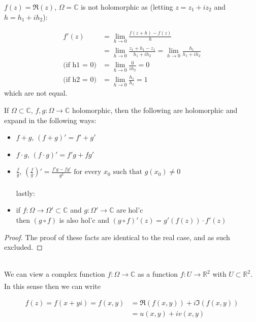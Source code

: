 \begin{example}
$f(z)=\Re(z)$, $\Omega = \mathbb{C}$ is not holomorphic as (letting $z = z_1 + i z_2$ and $h = h_1 + i h_2$):

\begin{align*}
    f'(z) &= \lim_{h\xrightarrow{} 0}\frac{f(z+h)-f(z)}{h}\\
    &= \lim_{h\xrightarrow{} 0}\frac{z_1+h_1-z_1}{h_1+ih_2} = \lim_{h\xrightarrow{} 0}\frac{h_1}{h_1+ih_2}\\
    \text{(if h1 = 0)} &= \lim_{h\xrightarrow{} 0}\frac{0}{ih_2}=0\\
    \text{(if h2 = 0)} &= \lim_{h\xrightarrow{} 0}\frac{h_1}{h_1}=1
\end{align*} which are not equal.
\end{example}

\begin{lemma}
If $\Omega \subset \mathbb{C}$, $f,g:\Omega \xrightarrow{} \mathbb{C}$ holomorphic, then the following are holomorphic and expand in the following ways:

\begin{itemize}
    \item $f+g$, $(f+g)' = f'+g'$
    \item $f \cdot g$, $(f \cdot g)' = f'g+fg'$\\
    \item $\frac{f}{g}$, $\left( \frac{f}{g} \right)' = \frac{f'g-fg'}{g^2} \text{ for every $x_0$ such that $g(x_0) \neq 0$ }$\\\\
    lastly:
    \item if $f:\Omega\xrightarrow{}\Omega' \subset \mathbb{C}$ and $g:\Omega'\xrightarrow{}\mathbb{C}$ are hol'c\\ then $(g \circ f)$ is also hol'c and $(g \circ f)'(z) = g'(f(z))\cdot f'(z)$
\end{itemize}
\end{lemma}

\begin{proof}
The proof of these facts are identical to the real case, and as such excluded.
\end{proof}\\



We can view a complex function $f:\Omega \xrightarrow[]{} \mathbb{C}$ as a function $f:U \xrightarrow{} \mathbb{R}^2$ with $U \subset \mathbb{R}^2$. In this sense then we can write

\begin{align*}
f(z)=f(x+yi)=f(x,y) &= \Re (f(x,y)) + i \Im (f(x,y))\\ &= u(x,y)+iv(x,y)
\end{align*}

